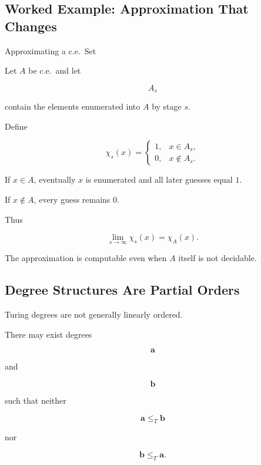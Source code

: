 \subsection{Worked Example: Approximation That Changes}
\label{subsec:worked-computable-approximation}

\begin{workedexamplebox}{Approximating a c.e.\ Set}

Let \(A\) be c.e.\ and let

\[
A_s
\]

contain the elements enumerated into \(A\) by stage \(s\).

Define

\[
\chi_s(x)
=
\begin{cases}
1,&x\in A_s,\\
0,&x\notin A_s.
\end{cases}
\]

If \(x\in A\), eventually \(x\) is enumerated and all later guesses equal
\(1\).

If \(x\notin A\), every guess remains \(0\).

Thus

\begin{answerbox}
\[
\boxed{
\lim_{s\to\infty}
\chi_s(x)
=
\chi_A(x).
}
\]
\end{answerbox}

The approximation is computable even when \(A\) itself is not decidable.

\end{workedexamplebox}

\subsection{Degree Structures Are Partial Orders}
\label{subsec:degree-partial-order}

Turing degrees are not generally linearly ordered.

There may exist degrees

\[
\mathbf{a}
\]

and

\[
\mathbf{b}
\]

such that neither

\[
\mathbf{a}\leq_T\mathbf{b}
\]

nor

\[
\mathbf{b}\leq_T\mathbf{a}.
\]

